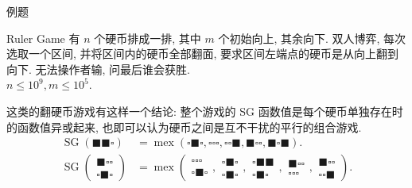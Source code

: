 \documentclass{beamer}
\begin{document}
	\begin{frame}{例题}
		\begin{block}{Ruler Game}
			有 $n$ 个硬币排成一排, 其中 $m$ 个初始向上, 其余向下. 双人博弈, 每次选取一个区间, 并将区间内的硬币全部翻面, 要求区间左端点的硬币是从向上翻到向下. 无法操作者输, 问最后谁会获胜.\\
			$n\leq 10^9, m\leq 10^5$.
		\end{block}
		\pause
		这类的翻硬币游戏有这样一个结论: 整个游戏的 SG 函数值是每个硬币单独存在时的函数值异或起来, 也即可以认为硬币之间是互不干扰的平行的组合游戏.
		\begin{align*}
			\operatorname{SG}\left(\blacksquare\blacksquare\square\right)&=\operatorname{mex}\left(\square\blacksquare\square,\square\square\square,\square\square\blacksquare,\blacksquare\square\square,\blacksquare\square\blacksquare\right).\\
			\operatorname{SG}\left(\begin{aligned}
				\blacksquare\square\square\\
				\square\blacksquare\square
			\end{aligned}\right)&=\operatorname{mex}\left(\begin{aligned}
				\square\square\square\\
				\square\blacksquare\square
			\end{aligned},
			\begin{aligned}
				\square\blacksquare\square\\
				\square\blacksquare\square
			\end{aligned},
			\begin{aligned}
				\square\blacksquare\blacksquare\\
				\square\blacksquare\square
			\end{aligned},
			\begin{aligned}
				\blacksquare\square\square\\
				\square\square\square
			\end{aligned},
			\begin{aligned}
				\blacksquare\square\square\\
				\square\square\blacksquare
			\end{aligned}
			\right).
		\end{align*}


\end{frame}
\end{document}
